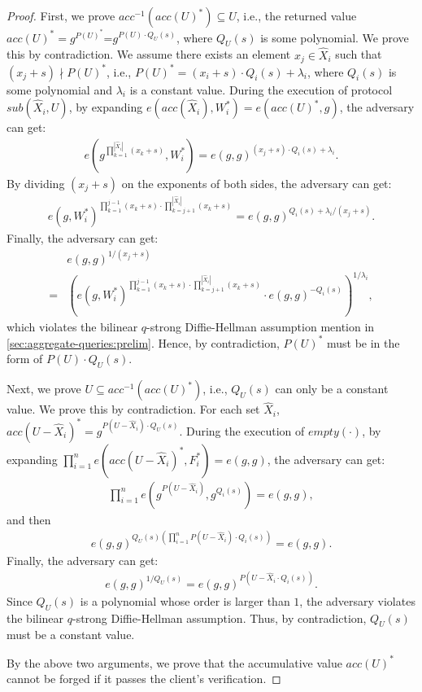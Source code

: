 \begin{proof}
  First, we prove $acc^{-1}({acc(U)}^*)\subseteq U$, i.e., the returned value ${acc(U)}^*=g^{{P(U)}^*}$=$g^{P(U) \cdot Q_U(s)}$, where $Q_U(s)$ is some polynomial. We prove this by contradiction.
  We assume there exists an element $x_j \in \widehat{X}_i$ such that $(x_j + s) \nmid {P(U)}^*$, i.e., ${P(U)}^* = (x_i + s) \cdot Q_i(s) + \lambda_i$, where $Q_i(s)$ is some polynomial and $\lambda_i$ is a constant value. During the execution of protocol $sub(\widehat{X}_i, U)$, by expanding $e(acc(\widehat{X}_i), W_i^*) = e({acc(U)}^*, g)$, the adversary can get:
  \begin{align*}
    e(g^{\prod_{k=1}^{|\widehat{X}_i|}(x_k+s) }, W_i^*)  = {e(g, g)}^{(x_j+s) \cdot Q_i(s) + \lambda_i}.
  \end{align*}
  By dividing $(x_j+s)$ on the exponents of both sides, the adversary can get:
  \begin{align*}
    {e(g, W_i^*)}^{\prod_{k=1}^{j-1}{(x_k+s)} \cdot \prod_{k=j+1}^{|\widehat{X}_i|}{(x_k+s)}} = {e (g, g)}^{Q_i(s) + \lambda_i/(x_j+s)}.
  \end{align*}
  Finally, the adversary can get:
  \begin{align}
&{e(g, g)}^{1/(x_j + s)}  \nonumber \\
    = &{({e(g, W_i^*)}^{\prod_{k=1}^{j-1}(x_k+s) \cdot \prod_{k=j+1}^{|\widehat{X}_i|}{(x_k+s)}} \cdot {e(g, g)}^{-Q_i(s)})}^{1/\lambda_i},\nonumber
  \end{align}
  which violates the bilinear $q$-strong Diffie-Hellman assumption mention in \cref{sec:aggregate-queries:prelim}. Hence, by contradiction, ${P(U)}^*$ must be in the form of $P(U) \cdot Q_U(s)$.

  Next, we prove $U \subseteq acc^{-1}({acc(U)}^*)$, i.e., $Q_U(s)$ can only be a constant value. We prove this by contradiction. For each set $\widehat{X}_i$, ${acc(U - \widehat{X}_i)}^* = g^{P(U-\widehat{X}_i) \cdot Q_U(s)}$. During the execution of $empty(\cdot)$, by expanding $\prod_{i=1}^n e({acc(U-\widehat{X}_i)}^*, F_i^*)=e(g, g)$, the adversary can get:
  \begin{align*}
    \prod_{i=1}^n e(g^{P(U-\widehat{X}_i)}, g^{Q_i(s)}) = e(g, g),
  \end{align*}
  and then
  \begin{align*}
    {e(g,g)}^{Q_U(s)(\prod_{i=1}^n P(U-\widehat{X}_i)\cdot Q_i(s))}=e(g,g).
  \end{align*}
  Finally, the adversary can get:
  \begin{align*}
    {e(g, g)}^{1/Q_U(s)} = {e(g, g)}^{P(U-\widehat{X}_i \cdot Q_i(s))}.
  \end{align*}
  Since $Q_U(s)$ is a polynomial whose order is larger than $1$, the adversary violates the bilinear $q$-strong Diffie-Hellman assumption. Thus, by contradiction, $Q_U(s)$ must be a constant value.

  By the above two arguments, we prove that the accumulative value ${acc(U)}^*$ cannot be forged if it passes the client's verification.
\end{proof}

